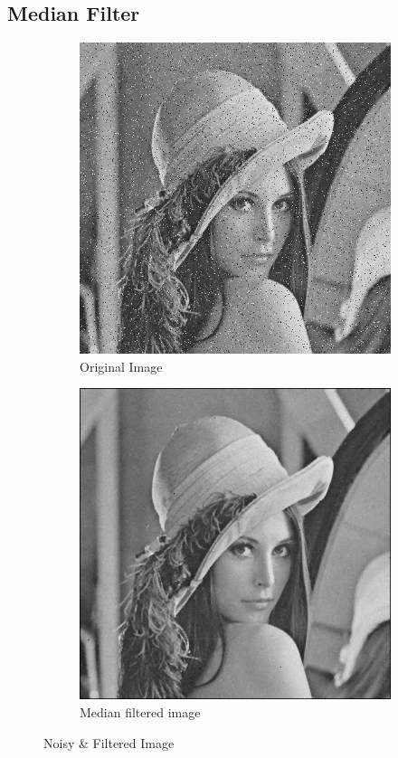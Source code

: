 \documentclass[a4paper,16pt]{article}
\begin{document}
	\subsection{Median Filter}
	\vspace{0.2in}
	
		\begin{figure}[h!]
		\begin{subfigure}[h]{0.5\linewidth}
			\includegraphics[width=\linewidth]{salt}
			\caption{Original Image}
		\end{subfigure}
		\hfill
		\begin{subfigure}[h]{0.5\linewidth}
			\includegraphics[width=\linewidth]{medianfilt}
			\caption{Median filtered image}
		\end{subfigure}%
		\caption{Noisy \& Filtered Image}
	\end{figure}
	\newpage
\end{document}

